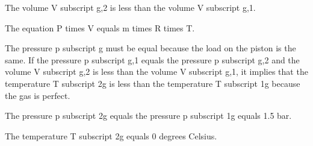 The volume V subscript g,2 is less than the volume V subscript g,1.

The equation P times V equals m times R times T.

The pressure p subscript g must be equal because the load on the piston is the same. If the pressure p subscript g,1 equals the pressure p subscript g,2 and the volume V subscript g,2 is less than the volume V subscript g,1, it implies that the temperature T subscript 2g is less than the temperature T subscript 1g because the gas is perfect.

The pressure p subscript 2g equals the pressure p subscript 1g equals 1.5 bar.

The temperature T subscript 2g equals 0 degrees Celsius.